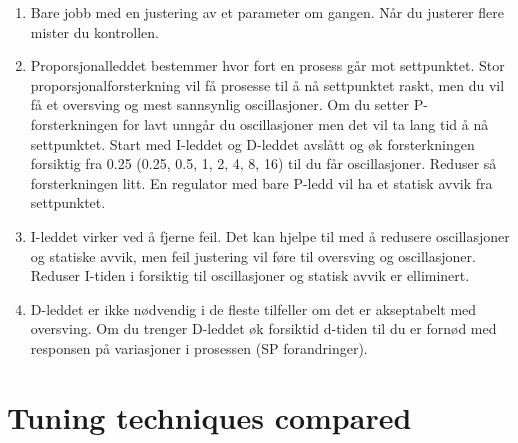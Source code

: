 \begin{enumerate}
	\item Bare jobb med en justering av et parameter om gangen. Når du justerer flere mister du kontrollen. 
	\item Proporsjonalleddet bestemmer hvor fort en prosess går mot settpunktet. Stor proporsjonalforsterkning vil få prosesse til å nå settpunktet raskt, men du vil få et oversving og mest sannsynlig oscillasjoner. Om du setter P-forsterkningen for lavt unngår du oscillasjoner men det vil ta lang tid å nå settpunktet. Start med I-leddet og D-leddet avslått og øk forsterkningen forsiktig  fra 0.25 (0.25, 0.5, 1, 2, 4, 8, 16) til du får oscillasjoner. Reduser så forsterkningen litt. En regulator med bare P-ledd vil ha et statisk avvik fra settpunktet. 
	\item I-leddet virker ved å fjerne feil. Det kan hjelpe til med å redusere oscillasjoner og statiske avvik, men feil justering vil føre til oversving og oscillasjoner. Reduser I-tiden i forsiktig til oscillasjoner og statisk avvik er elliminert. 
	\item D-leddet er ikke nødvendig i de fleste tilfeller om det er akseptabelt med oversving. Om du trenger D-leddet øk forsiktid d-tiden til du er fornød med responsen på variasjoner i prosessen  (SP forandringer).
\end{enumerate}









\filbreak
\section{Tuning techniques compared}

